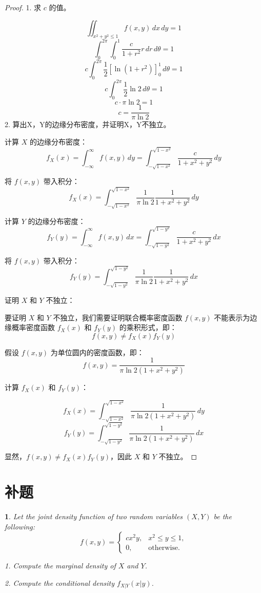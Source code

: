 \documentclass[UTF8]{report}
\theoremstyle{MyLineTheoremStyle} %
\theoremstyle{MyBlockTheoremStyle} %
\theoremstyle{MySubsubsectionStyle} %
\newtheorem{definition}{}
\begin{document}
\begin{proof}
    1. 求 $c$ 的值。\par
\[
\iint_{x^2 + y^2 \leq 1} f(x, y) \, dx \, dy = 1
\]
\[
\int_{0}^{2\pi} \int_{0}^{1} \frac{c}{1 + r^2} r \, dr \, d\theta = 1
\]
\[
c \int_{0}^{2\pi} \frac{1}{2}\left[ \ln(1 + r^2) \right]_{0}^{1} \, d\theta = 1
\]
\[
c \int_{0}^{2\pi} \frac{1}{2}\ln 2 \, d\theta = 1
\]
\[
c \cdot \pi \ln 2 = 1
\]
\[
c = \frac{1}{\pi \ln 2}
\]
    2. 算出X，Y的边缘分布密度，并证明X，Y不独立。\par
    计算 $X$ 的边缘分布密度：
    \[
    f_X(x) = \int_{-\infty}^{\infty} f(x, y) \, dy = \int_{-\sqrt{1-x^2}}^{\sqrt{1-x^2}} \frac{c}{1 + x^2 + y^2} \, dy
    \]
    
    将 $f(x, y)$ 带入积分：
    \[
    f_X(x) = \int_{-\sqrt{1-x^2}}^{\sqrt{1-x^2}} \frac{1}{\pi \ln 2} \frac{1}{1 + x^2 + y^2} \, dy
    \]
    
    计算 $Y$ 的边缘分布密度：
    \[
    f_Y(y) = \int_{-\infty}^{\infty} f(x, y) \, dx = \int_{-\sqrt{1-y^2}}^{\sqrt{1-y^2}} \frac{c}{1 + x^2 + y^2} \, dx
    \]
    
    将 $f(x, y)$ 带入积分：
    \[
    f_Y(y) = \int_{-\sqrt{1-y^2}}^{\sqrt{1-y^2}} \frac{1}{\pi \ln 2} \frac{1}{1 + x^2 + y^2} \, dx
    \]
    
    证明 $X$ 和 $Y$ 不独立：
    
    要证明 $X$ 和 $Y$ 不独立，我们需要证明联合概率密度函数 $f(x, y)$ 不能表示为边缘概率密度函数 $f_X(x)$ 和 $f_Y(y)$ 的乘积形式，即：
    \[
    f(x, y) \neq f_X(x) f_Y(y)
    \]
    
    假设 $f(x, y)$ 为单位圆内的密度函数，即：
    \[
    f(x, y) = \frac{1}{\pi \ln 2 (1 + x^2 + y^2)}
    \]
    
    计算 $f_X(x)$ 和 $f_Y(y)$：
    
    \[
    f_X(x) = \int_{-\sqrt{1-x^2}}^{\sqrt{1-x^2}} \frac{1}{\pi \ln 2 (1 + x^2 + y^2)} \, dy
    \]
\[
f_Y(y) = \int_{-\sqrt{1-y^2}}^{\sqrt{1-y^2}} \frac{1}{\pi \ln 2 (1 + x^2 + y^2)} \, dx
\]

显然，$f(x, y) \neq f_X(x) f_Y(y)$，因此 $X$ 和 $Y$ 不独立。
\end{proof}

\section{补题}
\begin{definition}
    Let the joint density function of two random variables $(X, Y)$ be the following:
    \[
    f(x, y) =
    \begin{cases}
    cx^2y, & x^2 \leq y \leq 1, \\
    0, & \text{otherwise}.
    \end{cases}
    \]
    
    1. Compute the marginal density of $X$ and $Y$.
    
    2. Compute the conditional density $f_{X|Y}(x|y)$.
\end{definition}
\end{document}
